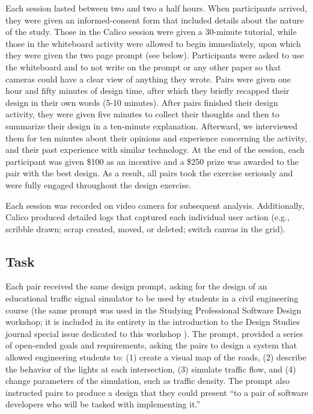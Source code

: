 Each session lasted between two and two a half hours. When participants arrived, they were given an informed-consent form that included details about the nature of the study. Those in the Calico session were given a 30-minute tutorial, while those in the whiteboard activity were allowed to begin immediately, upon which they were given the two page prompt (see below). Participants were asked to use the whiteboard and to not write on the prompt or any other paper so that cameras could have a clear view of anything they wrote. Pairs were given one hour and fifty minutes of design time, after which they briefly recapped their design in their own words (5-10 minutes). After pairs finished their design activity, they were given five minutes to collect their thoughts and then to summarize their design in a ten-minute explanation. Afterward, we interviewed them for ten minutes about their opinions and experience concerning the activity, and their past experience with similar technology. At the end of the session, each participant was given \$100 as an incentive and a \$250 prize was awarded to the pair with the best design. As a result, all pairs took the exercise seriously and were fully engaged throughout the design exercise. 

Each session was recorded on video camera for subsequent analysis. Additionally, Calico produced detailed logs that captured each individual user action (e.g., scribble drawn; scrap created, moved, or deleted; switch canvas in the grid).

\subsection {Task}
\label{experimentaldesign:3}

Each pair received the same design prompt, asking for the design of an educational traffic signal simulator to be used by students in a civil engineering course (the same prompt was used in the Studying Professional Software Design workshop; it is included in its entirety in the introduction to the Design Studies journal special issue dedicated to this workshop \citep{Petreb}). The prompt, provided a series of open-ended goals and requirements, asking the pairs to design a system that allowed engineering students to: (1) create a visual map of the roads, (2) describe the behavior of the lights at each intersection, (3) simulate traffic flow, and (4) change parameters of the simulation, such as traffic density. The prompt also instructed pairs to produce a design that they could present ``to a pair of software developers who will be tasked with implementing it.'' 


